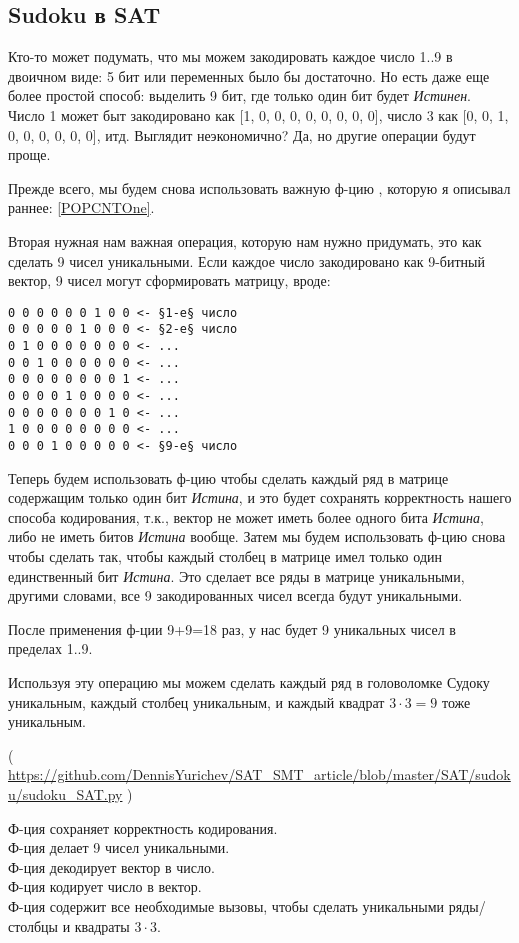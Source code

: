 \subsection{Sudoku в SAT}
\label{Sudoku_SAT}

Кто-то может подумать, что мы можем закодировать каждое число 1..9 в двоичном виде: 5 бит или переменных было бы достаточно.
Но есть даже еще более простой способ: выделить 9 бит, где только один бит будет \textit{Истинен}.
Число 1 может быт закодировано как [1, 0, 0, 0, 0, 0, 0, 0, 0], число 3 как [0, 0, 1, 0, 0, 0, 0, 0, 0], итд.
Выглядит неэкономично? Да, но другие операции будут проще.

Прежде всего, мы будем снова использовать важную ф-цию , которую я описывал раннее: \ref{POPCNTOne}.

Вторая нужная нам важная операция, которую нам нужно придумать, это как сделать 9 чисел уникальными.
Если каждое число закодировано как 9-битный вектор, 9 чисел могут сформировать матрицу, вроде:

\begin{lstlisting}
0 0 0 0 0 0 1 0 0 <- §1-е§ число
0 0 0 0 0 1 0 0 0 <- §2-е§ число
0 1 0 0 0 0 0 0 0 <- ...
0 0 1 0 0 0 0 0 0 <- ...
0 0 0 0 0 0 0 0 1 <- ...
0 0 0 0 1 0 0 0 0 <- ...
0 0 0 0 0 0 0 1 0 <- ...
1 0 0 0 0 0 0 0 0 <- ...
0 0 0 1 0 0 0 0 0 <- §9-е§ число
\end{lstlisting}

Теперь будем использовать ф-цию  чтобы сделать каждый ряд в матрице содержащим только один бит \textit{Истина},
и это будет сохранять корректность нашего способа кодирования, т.к., вектор не может иметь более одного бита \textit{Истина},
либо не иметь битов \textit{Истина} вообще.
Затем мы будем использовать ф-цию  снова чтобы сделать так, чтобы каждый столбец в матрице имел только
один единственный бит \textit{Истина}.
Это сделает все ряды в матрице уникальными, другими словами, все 9 закодированных чисел всегда будут уникальными.

После применения ф-ции  9+9=18 раз, у нас будет 9 уникальных чисел в пределах 1..9.

Используя эту операцию мы можем сделать каждый ряд в головоломке Судоку уникальным, каждый столбец уникальным,
и каждый квадрат $3 \cdot 3=9$ тоже уникальным.


( \url{https://github.com/DennisYurichev/SAT_SMT_article/blob/master/SAT/sudoku/sudoku_SAT.py} )

Ф-ция  сохраняет корректность кодирования.\\
Ф-ция  делает 9 чисел уникальными.\\
Ф-ция  декодирует вектор в число.\\
Ф-ция  кодирует число в вектор.\\
Ф-ция  содержит все необходимые вызовы, чтобы сделать уникальными ряды/столбцы и квадраты $3\cdot 3$.

